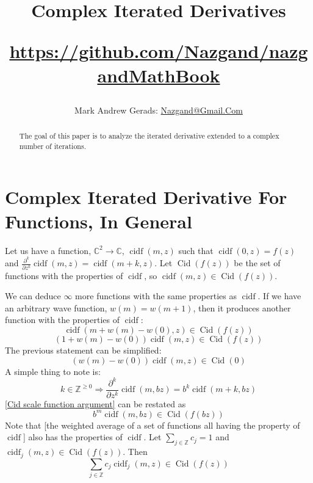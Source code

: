 \documentclass[]{article}
\author{Mark Andrew Gerads: \href{MailTo:Nazgand@Gmail.Com}{Nazgand@Gmail.Com}}
\title{
	Complex Iterated Derivatives
	
	\href{https://github.com/Nazgand/nazgandMathBook}{https://github.com/Nazgand/nazgandMathBook}
}
\DeclareMathOperator{\cidf}{cidf}
\DeclareMathOperator{\Cid}{Cid}
\newcommand{\pqty}[1]{{\left(#1\right)}}
\newcommand{\pdiff}[2]{\frac{\partial^{#2}}{\partial #1^{#2}}}
\numberwithin{equation}{section}
\begin{document}
	
	\maketitle
	
	\begin{abstract}
		The goal of this paper is to analyze the iterated derivative extended to a complex number of iterations.
	\end{abstract}
	
	\section{Complex Iterated Derivative For Functions, In General}
	Let us have a function, $\mathbb{C}^2\to\mathbb{C}$, $\cidf\pqty{m,z}$ such that $\cidf\pqty{0,z}=f\pqty{z}$ and $\pdiff{z}{k}\cidf\pqty{m,z}=\cidf\pqty{m+k,z}$. Let $\Cid\pqty{f\pqty{z}}$ be the set of functions with the properties of $\cidf$, so $\cidf\pqty{m,z}\in\Cid\pqty{f\pqty{z}}$.
	
	We can deduce $\infty$ more functions with the same properties as $\cidf$. 
	If we have an arbitrary wave function, $w\pqty{m}=w\pqty{m+1}$, then it produces another function with the properties of $\cidf$:
	\begin{equation}
		\cidf\pqty{m+w\pqty{m}-w\pqty{0},z}\in \Cid\pqty{f\pqty{z}}
	\end{equation}
	\begin{equation}
		\pqty{1+w\pqty{m}-w\pqty{0}}\cidf\pqty{m,z}\in \Cid\pqty{f\pqty{z}}
	\end{equation}
	The previous statement can be simplified:
	\begin{equation}
		\pqty{w\pqty{m}-w\pqty{0}}\cidf\pqty{m,z}\in \Cid\pqty{0}
	\end{equation}
	A simple thing to note is:
	\begin{equation}
		\label{Cid scale function argument}
		k\in\mathbb{Z}^{\geq 0}
		\Rightarrow
		\pdiff{z}{k}\cidf\pqty{m,bz}=b^k\cidf\pqty{m+k,bz}
	\end{equation}
	\eqref{Cid scale function argument} can be restated as
	\begin{equation}
		b^m\cidf\pqty{m,bz}\in\Cid\pqty{f\pqty{bz}}
	\end{equation}
	Note that [the weighted average of a set of functions all having the property of $\cidf$] also has the properties of $\cidf$. Let $\sum_{j\in\mathbb{Z}}c_j=1$ and $\cidf_j\pqty{m,z}\in\Cid\pqty{f\pqty{z}}$. Then
	\begin{equation}
		\sum_{j\in\mathbb{Z}}c_j \cidf_j\pqty{m,z}\in \Cid\pqty{f\pqty{z}}
	\end{equation}
	
\end{document}
